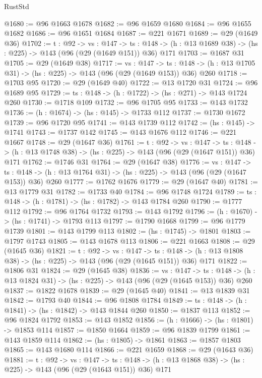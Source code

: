 \begin{lexlean}{RustStd}
\begin{coremodule}
@1680 := @96 @1663 @1678
@1682 := @96 @1659 @1680
@1684 := @96 @1655 @1682
@1686 := @96 @1651 @1684
@1687 := @221 @1671
@1689 := @29 (@1649 @36)
@1702 := {t : @92} ->
  {vs : @147} ->
  {ts : @148} -> (h : @13 @1689 @38) -> (hs : @225) -> @143 (@96 (@29 (@1649 @151)) @36) @171
@1703 := @1687 @31
@1705 := @29 (@1649 @38)
@1717 := {vs : @147} ->
  {ts : @148} -> (h : @13 @1705 @31) -> (hs : @225) -> @143 (@96 (@29 (@1649 @153)) @36) @260
@1718 := @1703 @95
@1720 := @29 (@1649 @40)
@1722 := @13 @1720 @31
@1724 := @96 @1689 @95
@1729 := {ts : @148} -> (h : @1722) -> (hs : @271) -> @143 @1724 @260
@1730 := @1718 @109
@1732 := @96 @1705 @95
@1733 := @143 @1732
@1736 := (h : @1674) -> (hs : @145) -> @1733 @112
@1737 := @1730 @1672
@1739 := @96 @1720 @95
@1741 := @143 @1739 @112
@1742 := (hs : @145) -> @1741
@1743 := @1737 @142
@1745 := @143 @1676 @112
@1746 := @221 @1667
@1748 := @29 (@1647 @36)
@1761 := {t : @92} ->
  {vs : @147} ->
  {ts : @148} -> (h : @13 @1748 @38) -> (hs : @225) -> @143 (@96 (@29 (@1647 @151)) @36) @171
@1762 := @1746 @31
@1764 := @29 (@1647 @38)
@1776 := {vs : @147} ->
  {ts : @148} -> (h : @13 @1764 @31) -> (hs : @225) -> @143 (@96 (@29 (@1647 @153)) @36) @260
@1777 := @1762 @1676
@1779 := @29 (@1647 @40)
@1781 := @13 @1779 @31
@1782 := @1733 @40
@1784 := @96 @1748 @1724
@1789 := {ts : @148} -> (h : @1781) -> (hs : @1782) -> @143 @1784 @260
@1790 := @1777 @112
@1792 := @96 @1764 @1732
@1793 := @143 @1792
@1796 := (h : @1670) -> (hs : @1741) -> @1793 @113
@1797 := @1790 @1668
@1799 := @96 @1779 @1739
@1801 := @143 @1799 @113
@1802 := (hs : @1745) -> @1801
@1803 := @1797 @1743
@1805 := @143 @1678 @113
@1806 := @221 @1663
@1808 := @29 (@1645 @36)
@1821 := {t : @92} ->
  {vs : @147} ->
  {ts : @148} -> (h : @13 @1808 @38) -> (hs : @225) -> @143 (@96 (@29 (@1645 @151)) @36) @171
@1822 := @1806 @31
@1824 := @29 (@1645 @38)
@1836 := {vs : @147} ->
  {ts : @148} -> (h : @13 @1824 @31) -> (hs : @225) -> @143 (@96 (@29 (@1645 @153)) @36) @260
@1837 := @1822 @1678
@1839 := @29 (@1645 @40)
@1841 := @13 @1839 @31
@1842 := @1793 @40
@1844 := @96 @1808 @1784
@1849 := {ts : @148} -> (h : @1841) -> (hs : @1842) -> @143 @1844 @260
@1850 := @1837 @113
@1852 := @96 @1824 @1792
@1853 := @143 @1852
@1856 := (h : @1666) -> (hs : @1801) -> @1853 @114
@1857 := @1850 @1664
@1859 := @96 @1839 @1799
@1861 := @143 @1859 @114
@1862 := (hs : @1805) -> @1861
@1863 := @1857 @1803
@1865 := @143 @1680 @114
@1866 := @221 @1659
@1868 := @29 (@1643 @36)
@1881 := {t : @92} ->
  {vs : @147} ->
  {ts : @148} -> (h : @13 @1868 @38) -> (hs : @225) -> @143 (@96 (@29 (@1643 @151)) @36) @171

\end{coremodule}
\end{lexlean}
